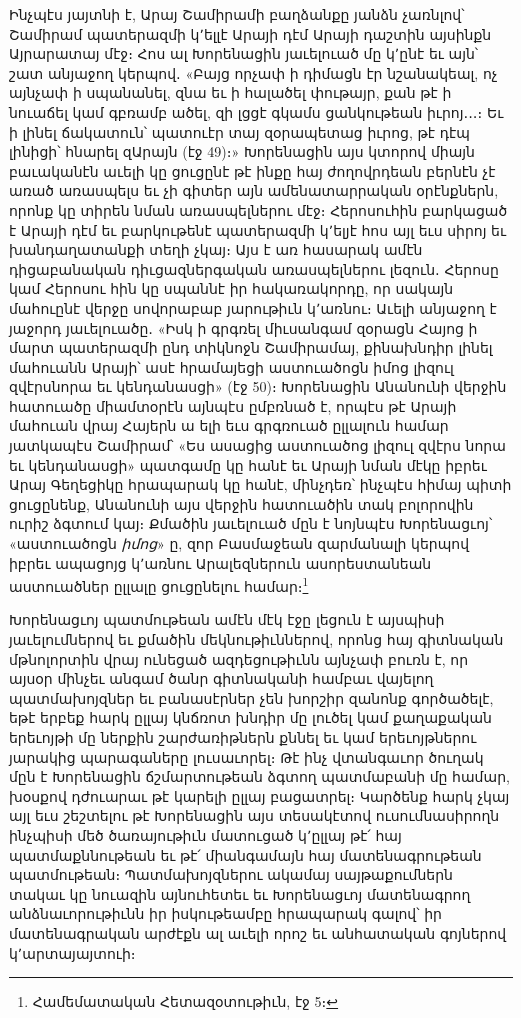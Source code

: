 \documentclass{article}
\begin{document}
{Ինչպէս յայտնի է, Արայ Շամիրամի բաղձանքը յանձն չառնլով՝ Շամիրամ պատերազմի կ՚ելլէ Արայի դէմ Արայի դաշտին այսինքն Այրարատայ մէջ։ Հոս ալ Խորենացին յաւելուած մը կ՚ընէ եւ այն՝ շատ անյաջող կերպով․ «Բայց որչափ ի դիմացն էր նշանակեալ, ոչ այնչափ ի սպանանել, զնա եւ ի հալածել փութայր, քան թէ ի նուաճել կամ գբռամբ ածել, զի լցցէ գկամս ցանկութեան իւրոյ․․․։ Եւ ի լինել ճակատուն՝ պատուէր տայ զօրապետաց իւրոց, թէ դէպ լինիցի՝ հնարել զԱրայն (էջ 49)։» Խորենացին այս կտորով միայն բաւականէն աւելի կը ցուցընէ թէ ինքը հայ ժողովրդեան բերնէն չէ առած առասպելս եւ չի գիտեր այն ամենատարրական օրէնքներն, որոնք կը տիրեն նման առասպելներու մէջ։ Հերոսուհին բարկացած է Արայի դէմ եւ բարկութենէ պատերազմի կ՚ելյէ հոս այլ եւս սիրոյ եւ խանդաղատանքի տեղի չկայ։ Այս է առ հասարակ ամէն դիցաբանական դիւցազներգական առասպելներու լեզուն․ Հերոսը կամ Հերոսու հին կը սպաննէ իր հակառակորդը, որ սակայն մահուընէ վերջը սովորաբաբ յարութիւն կ՚առնու։ Աւելի անյաջող է յաջորդ յաւելուածը․ «Իսկ ի գրգռել միւսանգամ զօրացն Հայոց ի մարտ պատերազմի ընդ տիկնոջն Շամիրամայ, քինախնդիր լինել մահուանն Արայի՝ ասէ հրամայեցի աստուածոցն իմոց լիզուլ զվէրսնորա եւ կենդանասցի» (էջ 50)։ Խորենացին Անանունի վերջին հատուածը միամտօրէն այնպէս ըմբռնած է, որպէս թէ Արայի մահուան վրայ Հայերն ա ելի եւս գրգռուած ըլլալուն համար յատկապէս Շամիրամ՝ «Ես ասացից աստուածոց լիզուլ զվէրս նորա եւ կենդանասցի» պատգամը կը հանէ եւ Արայի նման մէկը իբրեւ Արայ Գեղեցիկը հրապարակ կը հանէ, մինչդեռ՝ ինչպէս հիմայ պիտի ցուցընենք, Անանունի այս վերջին հատուածին տակ բոլորովին ուրիշ ձգտում կայ։ Քմածին յաւելուած մըն է նոյնպէս Խորենացւոյ՝ «աստուածոցն \emph{իմոց}» ը, զոր Բասմաջեան զարմանալի կերպով իբրեւ ապացոյց կ՚առնու Արալեզներուն ասորեստանեան աստուածներ ըլլալը ցուցընելու համար։\footnote{Համեմատական Հետազօտութիւն, էջ 5։}

Խորենացւոյ պատմութեան ամէն մէկ էջը լեցուն է այսպիսի յաւելումներով եւ քմածին մեկնութիւններով, որոնց հայ գիտնական մթնոլորտին վրայ ունեցած ազդեցութիւնն այնչափ բուռն է, որ այսօր մինչեւ անգամ ծանր գիտնականի համբաւ վայելող պատմախոյզներ եւ բանասէրներ չեն խորշիր զանոնք գործածելէ, եթէ երբեք հարկ ըլլայ կնճռոտ խնդիր մը լուծել կամ քաղաքական երեւոյթի մը ներքին շարժառիթներն քննել եւ կամ երեւոյթներու յարակից պարագաները լուսաւորել։ Թէ ինչ վտանգաւոր ծուղակ մըն է Խորենացին ճշմարտութեան ձգտող պատմաբանի մը համար, խօսքով դժուարաւ թէ կարելի ըլլայ բացատրել։ Կարծենք հարկ չկայ այլ եւս շեշտելու թէ Խորենացին այս տեսակէտով ուսումնասիրողն ինչպիսի մեծ ծառայութիւն մատուցած կ՚ըլլայ թէ՛ հայ պատմաքննութեան եւ թէ՛ միանգամայն հայ մատենագրութեան պատմութեան։ Պատմախոյզներու ակամայ սայթաքումներն տակաւ կը նուազին այնուհետեւ եւ Խորենացւոյ մատենագրող անձնաւորութիւնն իր իսկութեամբը հրապարակ գալով՝ իր մատենագրական արժէքն ալ աւելի որոշ եւ անհատական գոյներով կ՚արտայայտուի։

}
\end{document}
